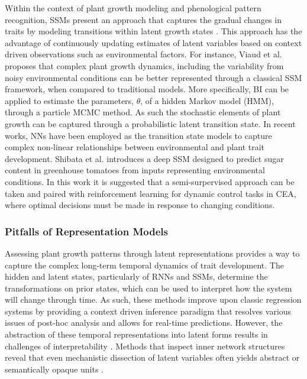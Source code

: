 \documentclass{article}
\begin{document}

Within the context of plant growth modeling and phenological pattern recognition, SSMs present an approach that captures the gradual changes in traits by modeling transitions within latent growth states \cite{2021_AugerMethe,9129053}. This approach has the advantage of continuously updating estimates of latent variables based on context driven observations such as environmental factors. For instance, Viaud et al. \cite{viaud2022full} proposes that complex plant growth dynamics, including the variability from noisy environmental conditions can be better represented through a classical SSM framework, when compared to traditional models. More specifically, BI can be applied to estimate the parameters, $\theta$, of a hidden Markov model (HMM), through a particle MCMC method. As such the stochastic elements of plant growth can be captured through a probabilistic latent transition state. In recent works, NNs have been employed as the transition state models to capture complex non-linear relationships between environmental and plant trait development. Shibata et al. \cite{2020_4261965} introduces a deep SSM designed to predict sugar content in greenhouse tomatoes from inputs representing environmental conditions. In this work it is suggested that a semi-surpervised approach can be taken and paired with reinforcement learning for dynamic control tasks in CEA, where optimal decisions must be made in response to changing conditions.


\subsubsection{Pitfalls of Representation Models}
\label{pitfallsrepresentation}
Assessing plant growth patterns through latent representations provides a way to capture the complex long-term temporal dynamics of trait development. 
The hidden and latent states, particularly of RNNs and SSMs, determine the transformations on prior states, which can be used to interpret how the system will change through time. 
As such, these methods improve upon classic regression systems by providing a context driven inference paradigm that resolves various issues of post-hoc analysis and allows for real-time predictions. 
However, the abstraction of these temporal representations into latent forms results in challenges of interpretability \cite{lipton2018mythos,o2025interpretability}. 
Methods that inspect inner network structures reveal that even mechanistic dissection of latent variables often yields abstract or semantically opaque units \cite{rauker2023toward}.
\end{document}
